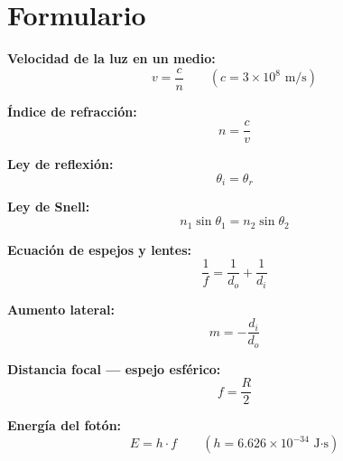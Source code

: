 
\section*{Formulario}

\begin{nota}

\textbf{Velocidad de la luz en un medio:}
$$v = \frac{c}{n} \qquad (c = 3 \times 10^8 \text{ m/s})$$

\vspace{0.3cm}

\textbf{Índice de refracción:}
$$n = \frac{c}{v}$$

\vspace{0.3cm}

\textbf{Ley de reflexión:}
$$\theta_i = \theta_r$$

\vspace{0.3cm}

\textbf{Ley de Snell:}
$$n_1 \sin\theta_1 = n_2 \sin\theta_2$$

\vspace{0.3cm}

\textbf{Ecuación de espejos y lentes:}
$$\frac{1}{f} = \frac{1}{d_o} + \frac{1}{d_i}$$

\vspace{0.3cm}

\textbf{Aumento lateral:}
$$m = -\frac{d_i}{d_o}$$

\vspace{0.3cm}

\textbf{Distancia focal — espejo esférico:}
$$f = \frac{R}{2}$$

\vspace{0.3cm}

\textbf{Energía del fotón:}
$$E = h \cdot f \qquad (h = 6.626 \times 10^{-34} \text{ J·s})$$

\end{nota}